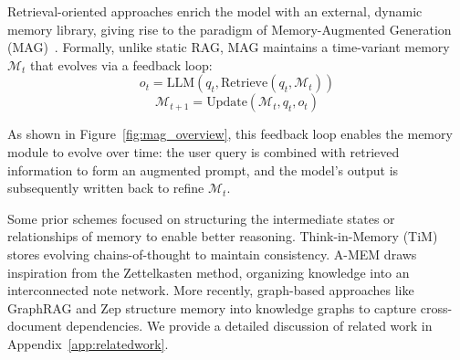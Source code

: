 \documentclass[11pt]{article}
\begin{document}
Retrieval-oriented approaches enrich the model with an external, dynamic memory library, giving rise to the paradigm of Memory-Augmented Generation (MAG)~\cite{zhong2024memorybank, park2023generative, huang2024emotional}. Formally, unlike static RAG, MAG maintains a time-variant memory $\mathcal{M}_t$ that evolves via a feedback loop:
\begin{equation}
    o_t = \text{LLM}(q_t, \text{Retrieve}(q_t, \mathcal{M}_t))
\end{equation}
\begin{equation}
    \mathcal{M}_{t+1} = \text{Update}(\mathcal{M}_t, q_t, o_t)
\end{equation}

As shown in Figure~\ref{fig:mag_overview}, this feedback loop enables the memory module to evolve over time: the user query is combined with retrieved information to form an augmented prompt, and the model’s output is subsequently written back to refine $\mathcal{M}_t$.




Some prior schemes focused on structuring the intermediate states or relationships of memory to enable better reasoning. 
Think-in-Memory (TiM) \citep{liu2023think} stores evolving chains-of-thought to maintain consistency. 
A-MEM \citep{xu2025mem} draws inspiration from the Zettelkasten method, organizing knowledge into an interconnected note network. 
More recently, graph-based approaches like GraphRAG \citep{edge2024graphrag} and Zep \citep{rasmussen2025zep} structure memory into knowledge graphs to capture cross-document dependencies. We provide a detailed discussion of related work in Appendix~\ref{app:relatedwork}.
\end{document}
